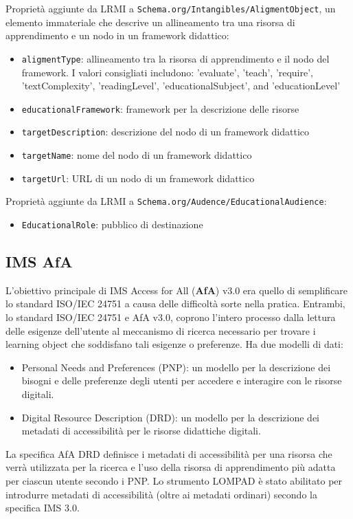 Proprietà aggiunte da LRMI a \texttt{Schema.org/Intangibles/AligmentObject}, un elemento immateriale che descrive un allineamento tra una risorsa di apprendimento e un nodo in un framework didattico:
\begin{itemize}
\item \texttt{aligmentType}: allineamento tra la risorsa di apprendimento e il nodo del framework. I valori consigliati includono: 'evaluate', 'teach', 'require', 'textComplexity', 'readingLevel', 'educationalSubject', and 'educationLevel'
\item \texttt{educationalFramework}: framework per la descrizione delle risorse
\item \texttt{targetDescription}: descrizione del nodo di un framework didattico
\item \texttt{targetName}: nome del nodo di un framework didattico
\item \texttt{targetUrl}: URL di un nodo di un framework didattico
\end{itemize}

Proprietà aggiunte da LRMI a \texttt{Schema.org/Audence/EducationalAudience}:
\begin{itemize}
\item \texttt{EducationalRole}: pubblico di destinazione
\end{itemize}

\subsection{IMS AfA}
L'obiettivo principale di IMS Access for All (\textbf{AfA}) v3.0 era quello di semplificare lo standard ISO/IEC 24751 a causa delle difficoltà sorte nella pratica. Entrambi, lo standard ISO/IEC 24751 e AfA v3.0, coprono l'intero processo dalla lettura delle esigenze dell'utente al meccanismo di ricerca necessario per trovare i learning object che soddisfano tali esigenze o preferenze. Ha due modelli di dati:
\begin{itemize}
\item Personal Needs and Preferences (PNP): un modello per la descrizione dei bisogni e delle preferenze degli utenti per accedere e interagire con le risorse digitali.
\item Digital Resource Description (DRD): un modello per la descrizione dei metadati di accessibilità per le risorse didattiche digitali.
\end{itemize}

La specifica AfA DRD definisce i metadati di accessibilità per una risorsa che verrà utilizzata per la ricerca e l'uso della risorsa di apprendimento più adatta per ciascun utente secondo i PNP. Lo strumento LOMPAD è stato abilitato per introdurre metadati di accessibilità (oltre ai metadati ordinari) secondo la specifica IMS 3.0.

